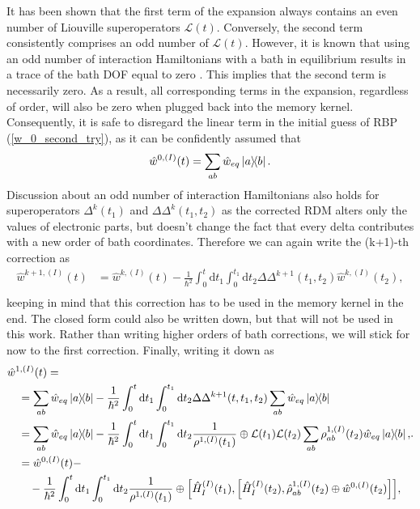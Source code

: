 It has been shown that the first term of the expansion always contains an even number of Liouville superoperators $\mathcal{L}(t)$. Conversely, the second term consistently comprises an odd number of $\mathcal{L}(t)$. However, it is known that using an odd number of interaction Hamiltonians with a bath in equilibrium results in a trace of the bath DOF equal to zero \cite{mukamel_principles_1995}. This implies that the second term is necessarily zero. As a result, all corresponding terms in the expansion, regardless of order, will also be zero when plugged back into the memory kernel. Consequently, it is safe to disregard the linear term in the initial guess of RBP (\ref{w_0_second_try}), as it can be confidently assumed that
\begin{equation}
\label{w_0_final_try}
    \hat{w}^{0, (I)}(t)  = \sum_{ab} \hat{w}_{eq} \ketbra{a}{b} .
\end{equation}
Discussion about an odd number of interaction Hamiltonians also holds for superoperators $\Delta^{k}(t_1)$ and $\Delta\Delta^{k}(t_1, t_2)$ as the corrected RDM alters only the values of electronic parts, but doesn't change the fact that every delta contributes with a new order of bath coordinates. Therefore we can again write the (k+1)-th correction as 
\begin{equation}
\label{ansatz_RBP_iterative_Delta_with_k_general}
    \begin{aligned}
    \hat{w}^{k+1,(I)}(t) &= \hat{w}^{k, (I)}(t) - \frac{1}{\hbar^2} \int_{0}^{t} \mathrm{d} t_1 \int_{0}^{t_1} \mathrm{d} t_2 \Delta\Delta^{k+1}(t_1, t_2) \hat{w}^{k, (I)}(t_2), \\
    \end{aligned}
\end{equation}
keeping in mind that this correction has to be used in the memory kernel in the end. The closed form could also be written down, but that will not be used in this work. Rather than writing higher orders of bath corrections, we will stick for now to the first correction. Finally, writing it down as 
\begin{equation}
\label{ansatz_RBP_iterative_Delta_with_k_1}
    \begin{aligned}
    &\hat{w}^{1,(I)}(t) =  \\
    &\quad =\sum_{ab} \hat{w}_{eq} \ketbra{a}{b} - \frac{1}{\hbar^2} \int_{0}^{t} \mathrm{d} t_1 \int_{0}^{t_1} \mathrm{d} t_2 \Delta\Delta^{k+1}(t, t_1, t_2) \sum_{ab} \hat{w}_{eq} \ketbra{a}{b} \\
    &\quad =\sum_{ab} \hat{w}_{eq} \ketbra{a}{b} - \frac{1}{\hbar^2} \int_{0}^{t} \mathrm{d} t_1 \int_{0}^{t_1} \mathrm{d} t_2 \frac{1}{\rho^{1, (I)}(t_1)} \oplus \mathcal{L}(t_1) \mathcal{L}(t_2) \sum_{ab} \rho_{ab}^{1, (I)}(t_2) \hat{w}_{eq} \ketbra{a}{b}, \\
    &\quad = \hat{w}^{0, (I)}(t) - \\
    &\quad \quad -\frac{1}{\hbar^2} \int_{0}^{t} \mathrm{d} t_1 \int_{0}^{t_1} \mathrm{d} t_2 \frac{1}{\rho^{1, (I)}(t_1)} \oplus \Big[\hat{H}_{I}^{(I)}(t_1), \Big[\hat{H}_{I}^{(I)}(t_2), \hat{\rho}_{ab}^{1, (I)}(t_2) \oplus \hat{w}^{0, (I)}(t_2) \Big]\Big] , \\
    \end{aligned}.
\end{equation}
